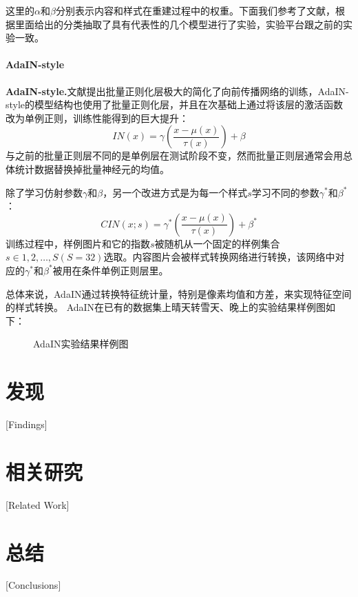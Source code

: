 这里的$\alpha$和$\beta$分别表示内容和样式在重建过程中的权重。下面我们参考了文献\cite{nst-survey}，根据里面给出的分类抽取了具有代表性的几个模型进行了实验，实验平台跟之前的实验一致。

\subsubsection[AdaIN-style]{AdaIN-style}

\textbf{AdaIN-style.}\cite{adain}\quad 文献\cite{ioffe}提出批量正则化层极大的简化了向前传播网络的训练，AdaIN-style的模型结构也使用了批量正则化层，并且在次基础上通过将该层的激活函数改为单例正则，训练性能得到的巨大提升：
$$ IN(x)=\gamma(\frac{x-\mu(x)}{\tau(x)})+\beta$$
与之前的批量正则层不同的是单例层在测试阶段不变，然而批量正则层通常会用总体统计数据替换掉批量神经元的均值。

除了学习仿射参数$\gamma$和$\beta$，另一个改进方式是为每一个样式$s$学习不同的参数$\gamma^*$和$\beta^*$：
$$CIN(x;s)=\gamma^*(\frac{x-\mu(x)}{\tau(x)})+\beta^*$$
训练过程中，样例图片和它的指数$s$被随机从一个固定的样例集合$s\in {1,2,\dots,S}(S=32)$选取。内容图片会被样式转换网络进行转换，该网络中对应的$\gamma^*$和$\beta^*$被用在条件单例正则层里。

总体来说，AdaIN通过转换特征统计量，特别是像素均值和方差，来实现特征空间的样式转换。
AdaIN在已有的数据集上晴天转雪天、晚上的实验结果样例图如下：
\begin{figure}[h]
    \centering
    \caption{AdaIN实验结果样例图}
\end{figure}

\chapter{发现}[Findings]

\chapter{相关研究}[Related Work]

\chapter{总结}[Conclusions]
